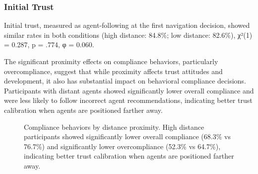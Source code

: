 \documentclass[12pt]{article}
\begin{document}
\subsubsection{Initial Trust}

Initial trust, measured as agent-following at the first navigation decision, showed similar rates in both conditions (high distance: 84.8\%; low distance: 82.6\%), χ²(1) = 0.287, p = .774, φ = 0.060.

The significant proximity effects on compliance behaviors, particularly overcompliance, suggest that while proximity affects trust attitudes and development, it also has substantial impact on behavioral compliance decisions. Participants with distant agents showed significantly lower overall compliance and were less likely to follow incorrect agent recommendations, indicating better trust calibration when agents are positioned farther away.

\begin{figure}[h]
\centering
{}
\caption{Compliance behaviors by distance proximity. High distance participants showed significantly lower overall compliance (68.3\% vs 76.7\%) and significantly lower overcompliance (52.3\% vs 64.7\%), indicating better trust calibration when agents are positioned farther away.}
\label{fig:compliance_behaviors}
\end{figure}
\end{document}
